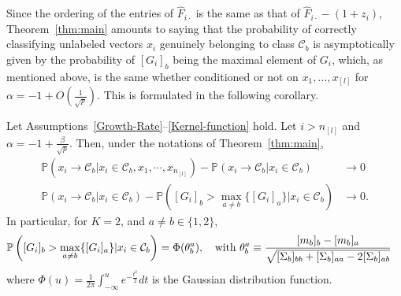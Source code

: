 \documentclass[twoside,11pt]{article}
\begin{document}
Since the ordering of the entries of $\hat F_{i\cdot}$ is the same as that of $\hat F_{i\cdot}-(1+z_i)$,  Theorem~\ref{thm:main} amounts to saying that the probability of correctly classifying unlabeled vectors $x_i$ genuinely belonging to class $\mathcal C_b$ is asymptotically given by the probability of $[G_{i}]_b$ being the maximal element of $G_i$, which, as mentioned above,  is the same whether conditioned or not on $x_1,\ldots,x_{[l]}$ for $\alpha=-1+O(\frac{1}{\sqrt{p}})$. This is formulated in the following corollary.
\begin{corollary}
	\label{cor:proba}
	Let Assumptions~\ref{Growth-Rate}--\ref{Kernel-function} hold. Let $i>n_{[l]}$ and $\alpha=-1+\frac{\beta}{\sqrt{p}}$. Then, under the notations of Theorem~\ref{thm:main}, 
	\begin{align*}
	{\mathbb P}\left(x_{i}\to\mathcal{C}_{b}|x_{i}\in\mathcal{C}_{b},x_{1},\cdots,x_{n_{[l]}}\right) - {\mathbb P}\left(x_{i}\to\mathcal{C}_{b}|x_{i}\in\mathcal{C}_{b}\right)  &\to 0\\
	{\mathbb P}\left(x_{i}\to\mathcal{C}_{b}|x_{i}\in\mathcal{C}_{b}\right) - {\mathbb P}\left([G_{i}]_b>\max_{a\neq b} \{[G_i]_a\}|x_{i}\in\mathcal{C}_{b}\right) &\to0.
	\end{align*}
	In particular, for $K=2$, and $a\neq b\in\{1,2\}$,
	\begin{align*}
	&{\mathbb P}\left([G_{i}]_b>\max_{a\neq b} \{[G_i]_a\}|x_{i}\in\mathcal{C}_{b}\right)= \Phi(\theta_b^a),\quad \textmd{with }\theta_b^a \equiv \frac{[m_b]_b-[m_b]_a}{\sqrt{[\Sigma_b]_{bb}+[\Sigma_b]_{aa}-2[\Sigma_b]_{ab}}}
	\end{align*}
	where $\Phi(u)=\frac1{2\pi}\int_{-\infty}^ue^{-\frac{t^2}2}dt$ is the Gaussian distribution function.
\end{corollary}
\end{document}
